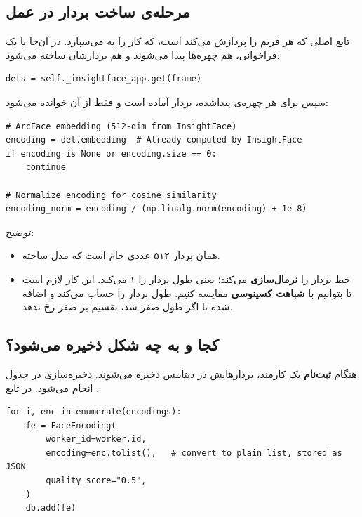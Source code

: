 \documentclass[12pt,a4paper]{article}
\begin{document}
\subsection{مرحله‌ی ساخت بردار در عمل}
تابع اصلی که هر فریم را پردازش می‌کند  است، که کار را به  می‌سپارد. در آن‌جا با یک فراخوانی، هم چهره‌ها پیدا می‌شوند و هم بردارشان ساخته می‌شود:

\begin{latin}
\begin{lstlisting}
dets = self._insightface_app.get(frame)
\end{lstlisting}
\end{latin}

سپس برای هر چهره‌ی پیداشده، بردار آماده است و فقط از آن خوانده می‌شود:

\begin{latin}
\begin{lstlisting}
# ArcFace embedding (512-dim from InsightFace)
encoding = det.embedding  # Already computed by InsightFace
if encoding is None or encoding.size == 0:
    continue

# Normalize encoding for cosine similarity
encoding_norm = encoding / (np.linalg.norm(encoding) + 1e-8)
\end{lstlisting}
\end{latin}

توضیح:
\begin{itemize}[rightmargin=0pt]
  \item {} همان بردار ۵۱۲ عددی خام است که مدل ساخته.
  \item خط  بردار را \textbf{نرمال‌سازی} می‌کند؛ یعنی طول بردار را ۱ می‌کند. این کار لازم است تا بتوانیم با \textbf{شباهت کسینوسی} مقایسه کنیم.  طول بردار را حساب می‌کند و  اضافه شده تا اگر طول صفر شد، تقسیم بر صفر رخ ندهد.
\end{itemize}

\subsection{کجا و به چه شکل ذخیره می‌شود؟}
هنگام \textbf{ثبت‌نام} یک کارمند، بردارهایش در دیتابیس ذخیره می‌شوند. ذخیره‌سازی در جدول  انجام می‌شود. در تابع :

\begin{latin}
\begin{lstlisting}
for i, enc in enumerate(encodings):
    fe = FaceEncoding(
        worker_id=worker.id,
        encoding=enc.tolist(),   # convert to plain list, stored as JSON
        quality_score="0.5",
    )
    db.add(fe)
\end{lstlisting}
\end{latin}
\end{document}
